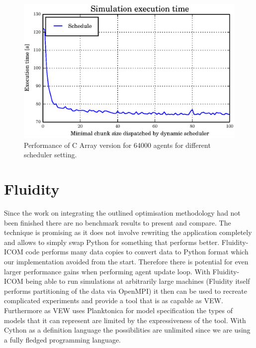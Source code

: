 \documentclass[12pt, a4paper]{report}
\begin{document}
\begin{figure}[H]
  \begin{center}
    \includegraphics[width=\columnwidth]{graphs/schedule-low.eps}
    \caption{Performance of C Array version for 64000 agents for different scheduler setting.}
    \label{fig:schedule-low}
  \end{center}
\end{figure}

\section{Fluidity}\label{sec:fluid-appcl}
Since the work on integrating the outlined optimisation methodology had
not been finished there are no benchmark results to present and compare.
The technique is promising as it does not involve rewriting the application
completely and allows to simply swap Python for something that performs
better. Fluidity-ICOM code performs many data copies to convert data
to Python format which our implementation avoided from the start. Therefore
there is potential for even larger performance gains when performing
agent update loop. With Fluidity-ICOM being able to run simulations
at arbitrarily large machines (Fluidity itself performs partitioning
of the data via OpenMPI) it then can be used to recreate complicated
experiments and provide a tool that is as capable as VEW. Furthermore
as VEW uses Planktonica for model specification the types of models that
it can represent are limited by the expressiveness of the tool. With
Cython as a definition language the possibilities are unlimited  since
we are using a fully fledged programming language.
\end{document}
